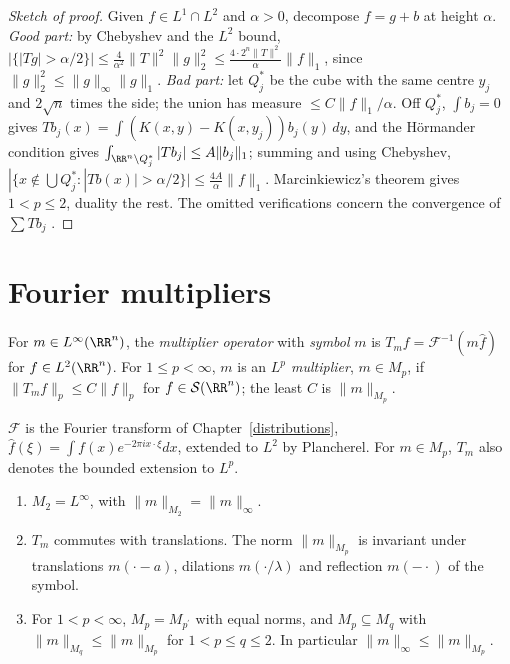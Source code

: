 \begin{proof}[Sketch of proof]
Given $f \in L^1 \cap L^2$ and $\alpha > 0$, decompose $f = g + b$ at height $\alpha$. \emph{Good part:} by Chebyshev and the $L^2$ bound, $|\{|Tg| > \alpha/2\}| \leq \frac{4}{\alpha^2}\|T\|^2\|g\|_2^2 \leq
\frac{4\cdot 2^n\|T\|^2}{\alpha}\|f\|_1$, since $\|g\|_2^2 \leq \|g\|_\infty\|g\|_1$. \emph{Bad part:} let $Q_j^*$ be the cube with the same centre $y_j$ and $2\sqrt n$ times the side; the union has measure
$\leq C\|f\|_1/\alpha$. Off $Q_j^*$, $\int b_j = 0$ gives $Tb_j(x) = \int(K(x, y) - K(x, y_j))b_j(y)\,dy$, and the H\"ormander condition gives $\int_{\RR^n \setminus Q_j^*}|Tb_j| \leq A\|b_j\|_1$; summing and using Chebyshev,
$|\{x \notin \bigcup Q_j^* : |Tb(x)| > \alpha/2\}| \leq \frac{4A}{\alpha}\|f\|_1$. Marcinkiewicz's theorem gives $1 < p \leq 2$, duality the rest. The omitted verifications concern the convergence of $\sum Tb_j$
\cite{stein-singular-integrals}.
\end{proof}

\section{Fourier multipliers}\label{harmonic-analysis:section-multipliers}

\begin{definition}\label{harmonic-analysis:definition-multiplier}
For $m \in L^\infty(\RR^n)$, the \emph{multiplier operator} with \emph{symbol} $m$ is $T_mf = \mathcal{F}^{-1}(m\hat f)$ for $f \in L^2(\RR^n)$. For $1 \leq p < \infty$, $m$ is an \emph{$L^p$ multiplier}, $m \in M_p$, if
$\|T_mf\|_p \leq C\|f\|_p$ for $f \in \mathcal{S}(\RR^n)$; the least $C$ is $\|m\|_{M_p}$.
\end{definition}

\begin{notation}\label{harmonic-analysis:notation-multiplier}
$\mathcal{F}$ is the Fourier transform of Chapter~\ref{distributions}, $\hat f(\xi) = \int f(x)e^{-2\pi ix\cdot\xi}dx$, extended to $L^2$ by Plancherel. For $m \in M_p$, $T_m$ also denotes the bounded extension to $L^p$.
\end{notation}

\begin{proposition}\label{harmonic-analysis:proposition-multipliers}
\begin{enumerate}
\item $M_2 = L^\infty$, with $\|m\|_{M_2} = \|m\|_\infty$.
\item $T_m$ commutes with translations. The norm $\|m\|_{M_p}$ is invariant under translations $m(\cdot - a)$, dilations $m(\cdot/\lambda)$ and reflection $m(-\cdot)$ of the symbol.
\item For $1 < p < \infty$, $M_p = M_{p^{\prime}}$ with equal norms, and $M_p \subseteq M_q$ with $\|m\|_{M_q} \leq \|m\|_{M_p}$ for $1 < p \leq q \leq 2$. In particular $\|m\|_\infty \leq \|m\|_{M_p}$.
\end{enumerate}
\end{proposition}

